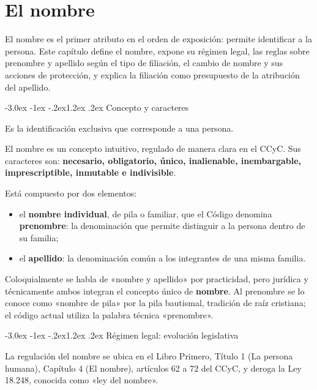 \documentclass[12pt,oneside]{book}
\makeatletter
\renewcommand\section{\@startsection{section}{1}{\z@}%
  {-3.0ex \@plus -1ex \@minus -.2ex}{1.2ex \@plus .2ex}%
  {\normalfont\large\bfseries\color{acento}}}
\makeatother
\begin{document}

\chapter{El nombre}
\label{cap:nombre}

El nombre es el primer atributo en el orden de exposición: permite identificar a la persona. Este capítulo define el nombre, expone su régimen legal, las reglas sobre prenombre y apellido según el tipo de filiación, el cambio de nombre y sus acciones de protección, y explica la filiación como presupuesto de la atribución del apellido.

\section{Concepto y caracteres}

\begin{definicion}[Nombre]
Es la identificación exclusiva que corresponde a una persona.
\end{definicion}

El nombre es un concepto intuitivo, regulado de manera clara en el CCyC. Sus caracteres son: \textbf{necesario, obligatorio, único, inalienable, inembargable, imprescriptible, inmutable e indivisible}.

Está compuesto por dos elementos:

\begin{itemize}
\item el \textbf{nombre individual}, de pila o familiar, que el Código denomina \textbf{prenombre}: la denominación que permite distinguir a la persona dentro de su familia;
\item el \textbf{apellido}: la denominación común a los integrantes de una misma familia.
\end{itemize}

Coloquialmente se habla de «nombre y apellido» por practicidad, pero jurídica y técnicamente ambos integran el concepto único de \textbf{nombre}. Al prenombre se lo conoce como «nombre de pila» por la pila bautismal, tradición de raíz cristiana; el código actual utiliza la palabra técnica «prenombre».

\section{Régimen legal: evolución legislativa}

La regulación del nombre se ubica en el Libro Primero, Título 1 (La persona humana), Capítulo 4 (El nombre), artículos 62 a 72 del CCyC, y deroga la Ley 18.248, conocida como «ley del nombre».
\end{document}
